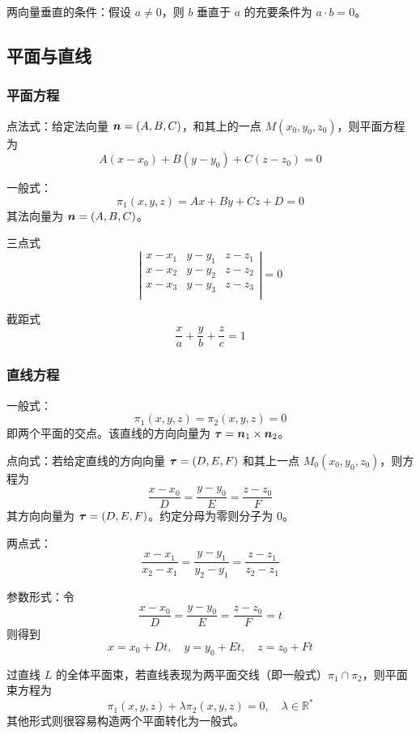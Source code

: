 两向量垂直的条件：假设 $a \neq 0$，则 $b$ 垂直于 $a$ 的充要条件为 $a \cdot b = 0$。

\subsection{平面与直线}

\subsubsection*{平面方程}

点法式：给定法向量 $\boldsymbol{n} = (A, B, C)$，和其上的一点 $M(x_0, y_0, z_0)$，则平面方程为
\[ A(x-x_0) + B(y-y_0) + C(z-z_0) = 0 \]

一般式：
\[ \pi_1(x, y, z) = Ax + By + Cz + D = 0 \]
其法向量为 $\boldsymbol{n} = (A, B, C)$。

三点式
\[ \left|\begin{matrix}
		x - x_1 & y - y_1 & z - z_1 \\
		x - x_2 & y - y_2 & z - z_2 \\
		x - x_3 & y - y_3 & z - z_3 \\
	\end{matrix} \right| = 0 \]

截距式
\[ \frac{x}{a} + \frac{y}{b} + \frac{z}{c} = 1 \]


\subsubsection*{直线方程}

一般式：
\[ \pi_1(x, y, z) = \pi_2(x, y, z) = 0 \]
即两个平面的交点。该直线的方向向量为 $\boldsymbol{\tau} = \boldsymbol{n}_1 \times \boldsymbol{n}_2$。

点向式：若给定直线的方向向量 $\boldsymbol{\tau} = (D, E, F)$ 和其上一点 $M_0(x_0, y_0, z_0)$，则方程为
\[ \frac{x - x_0}{D} = \frac{y - y_0}{E} = \frac{z - z_0}{F} \]
其方向向量为 $\boldsymbol{\tau} = (D, E, F)$。约定分母为零则分子为 $0$。

两点式：
\[ \frac{x - x_1}{x_2 - x_1} = \frac{y - y_1}{y_2 - y_1} = \frac{z - z_1}{z_2 - z_1} \]

参数形式：令
\[ \frac{x - x_0}{D} = \frac{y - y_0}{E} = \frac{z - z_0}{F} = t \]
则得到
\[ x = x_0 + Dt, \quad y = y_0 + Et, \quad z = z_0 + Ft \]

过直线 $L$ 的全体平面束，若直线表现为两平面交线（即一般式）$\pi_1 \cap \pi_2$，则平面束方程为
\[ \pi_1(x, y, z) + \lambda \pi_2(x, y, z) = 0, \quad \lambda \in \mathbb{R}^\ast \]
其他形式则很容易构造两个平面转化为一般式。

